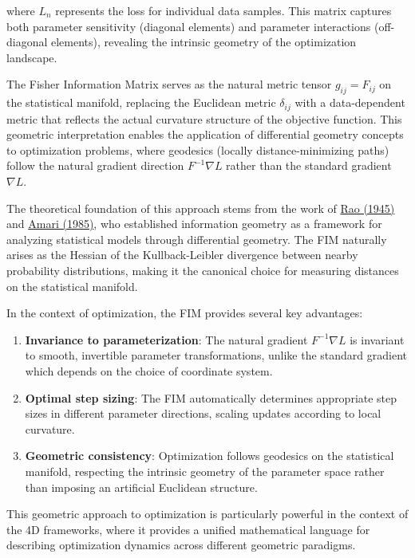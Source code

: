 \documentclass[
  10pt,
]{article}
\begin{document}
where \(L_n\) represents the loss for individual data samples. This
matrix captures both parameter sensitivity (diagonal elements) and
parameter interactions (off-diagonal elements), revealing the intrinsic
geometry of the optimization landscape.

The Fisher Information Matrix serves as the natural metric tensor
\(g_{ij} = F_{ij}\) on the statistical manifold, replacing the Euclidean
metric \(\delta_{ij}\) with a data-dependent metric that reflects the
actual curvature structure of the objective function. This geometric
interpretation enables the application of differential geometry concepts
to optimization problems, where geodesics (locally distance-minimizing
paths) follow the natural gradient direction \(F^{-1}\nabla L\) rather
than the standard gradient \(\nabla L\).

The theoretical foundation of this approach stems from the work of
\href{https://en.wikipedia.org/wiki/Cram\%C3\%A9r\%E2\%80\%93Rao_bound}{Rao
(1945)} and \href{https://en.wikipedia.org/wiki/Shun-ichi_Amari}{Amari
(1985)}, who established information geometry as a framework for
analyzing statistical models through differential geometry. The FIM
naturally arises as the Hessian of the Kullback-Leibler divergence
between nearby probability distributions, making it the canonical choice
for measuring distances on the statistical manifold.

In the context of optimization, the FIM provides several key advantages:

\begin{enumerate}
\def\labelenumi{\arabic{enumi}.}
\item
  \textbf{Invariance to parameterization}: The natural gradient
  \(F^{-1}\nabla L\) is invariant to smooth, invertible parameter
  transformations, unlike the standard gradient which depends on the
  choice of coordinate system.
\item
  \textbf{Optimal step sizing}: The FIM automatically determines
  appropriate step sizes in different parameter directions, scaling
  updates according to local curvature.
\item
  \textbf{Geometric consistency}: Optimization follows geodesics on the
  statistical manifold, respecting the intrinsic geometry of the
  parameter space rather than imposing an artificial Euclidean
  structure.
\end{enumerate}

This geometric approach to optimization is particularly powerful in the
context of the 4D frameworks, where it provides a unified mathematical
language for describing optimization dynamics across different geometric
paradigms.
\end{document}
